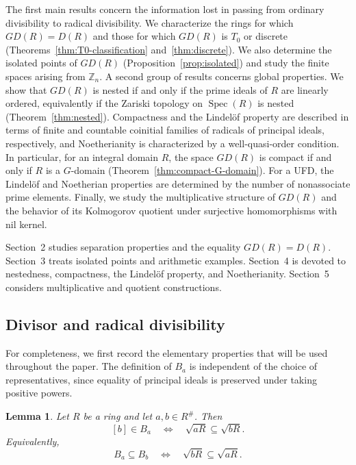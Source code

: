 \documentclass[11pt]{amsart}
\theoremstyle{plain}
\newtheorem{lemma}[theorem]{Lemma}
\theoremstyle{definition}
\theoremstyle{remark}
\numberwithin{equation}{section}
\begin{document}
The first main results concern the information lost in passing from ordinary
divisibility to radical divisibility. We characterize the rings for which $GD(R)=D(R)$ and those for which
$GD(R)$ is $T_0$ or discrete
(Theorems~\ref{thm:T0-classification} and~\ref{thm:discrete}). We also determine the isolated points of $GD(R)$
(Proposition~\ref{prop:isolated}) and study the finite spaces arising
from $\mathbb Z_n$. A second group of results concerns global properties. We show that $GD(R)$ is nested if and only if the prime ideals of $R$
are linearly ordered, equivalently if the Zariski topology on
$\operatorname{Spec}(R)$ is nested
(Theorem~\ref{thm:nested}). Compactness and the Lindel\"of property are described in terms of
finite and countable coinitial families of radicals of principal
ideals, respectively, and Noetherianity is characterized by a
well-quasi-order condition. In particular, for an integral domain $R$, the space $GD(R)$ is
compact if and only if $R$ is a $G$-domain
(Theorem~\ref{thm:compact-G-domain}). For a UFD, the Lindel\"of and Noetherian properties are
determined by the number of nonassociate prime elements. Finally, we study the multiplicative structure of $GD(R)$ and the
behavior of its Kolmogorov quotient under surjective homomorphisms
with nil kernel.

Section~2 studies separation properties and the equality $GD(R)=D(R)$.
Section~3 treats isolated points and arithmetic examples. Section~4 is devoted
to nestedness, compactness, the Lindel\"of property, and Noetherianity.
Section~5 considers multiplicative and quotient constructions.


\subsection{Divisor and radical divisibility}

For completeness, we first record the elementary properties that will be used
throughout the paper. The definition of $B_a$ is independent of the choice of
representatives, since equality of principal ideals is preserved under taking
positive powers.

\begin{lemma}\label{lem:radical-divisibility}
	Let $R$ be a ring and let $a,b\in R^\#$. Then
	\[
	[b]\in B_a
	\quad\Longleftrightarrow\quad
	\sqrt{aR}\subseteq\sqrt{bR}.
	\]
	Equivalently,
	\[
	B_a\subseteq B_b
	\quad\Longleftrightarrow\quad
	\sqrt{bR}\subseteq\sqrt{aR}.
	\]
\end{lemma}
\end{document}
